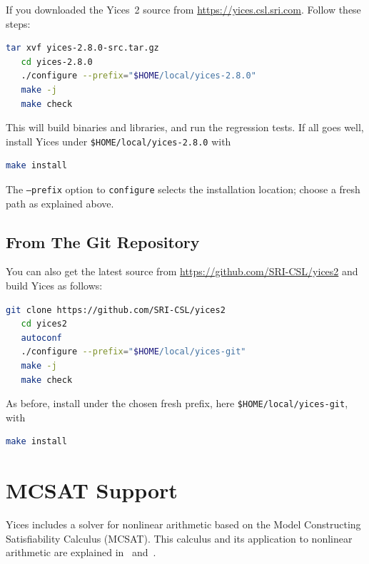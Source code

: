 \documentclass[11pt,twoside,fleqn,openright,titlepage]{cslreport}
\begin{document}
If you downloaded the Yices~2 source from \url{https://yices.csl.sri.com}. Follow these steps:
\begin{small}
\begin{lstlisting}[language=sh,deletekeywords={cd}]
   tar xvf yices-2.8.0-src.tar.gz
   cd yices-2.8.0
   ./configure --prefix="$HOME/local/yices-2.8.0"
   make -j
   make check
\end{lstlisting}
\end{small}
This will build binaries and libraries, and run the regression tests. If
all goes well, install Yices under \texttt{\$HOME/local/yices-2.8.0} with
\begin{small}
\begin{lstlisting}[language=sh]
   make install
\end{lstlisting}
\end{small}
The \texttt{--prefix} option to \texttt{configure} selects the installation
location; choose a fresh path as explained above.

\subsection*{From The Git Repository}

You can also get the latest source from \url{https://github.com/SRI-CSL/yices2} and build Yices as follows:
\begin{small}
\begin{lstlisting}[language=sh,deletekeywords={cd}]
   git clone https://github.com/SRI-CSL/yices2
   cd yices2
   autoconf
   ./configure --prefix="$HOME/local/yices-git"
   make -j
   make check
\end{lstlisting}
\end{small}
As before, install under the chosen fresh prefix, here
\texttt{\$HOME/local/yices-git}, with
\begin{small}
\begin{lstlisting}[language=sh]
   make install
\end{lstlisting}
\end{small}


\section{MCSAT Support}
\label{mcsat-install}

Yices includes a solver for nonlinear arithmetic based on the Model
Constructing Satisfiability Calculus (MCSAT). This calculus and its
application to nonlinear arithmetic are explained
in~\cite{Jovanovic-etal:MCSATb:2013}
and~\cite{deMouraJovanovic:nla:2012}.
\end{document}

